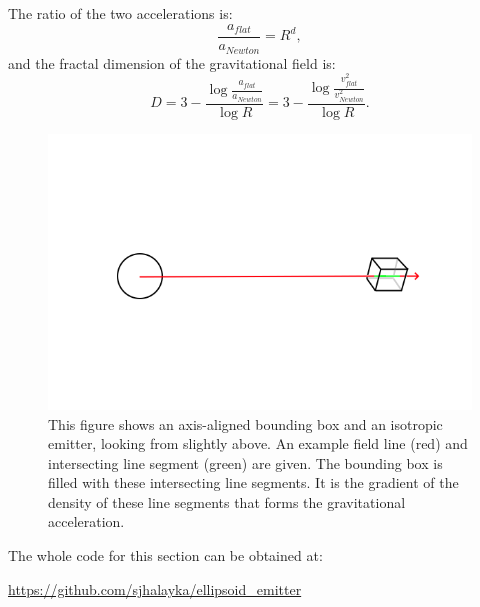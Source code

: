 \documentclass[12pt]{article}
\begin{document}
The ratio of the two accelerations is:
\begin{equation}
\frac{a_{\textit{flat}}}{a_{\textit{Newton}}} = R^{d}, 
\end{equation}
and the fractal dimension of the gravitational field is:
\begin{equation}
D = 3 - \frac{\log \frac{a_{\textit{flat}}}{a_{\textit{Newton}}}}{\log R} = 3 - \frac{\log \frac{v_{\textit{flat}}^2}{v_{\textit{Newton}}^2}}{\log R}.
\end{equation}

\begin{figure} 
\centering
\label{fig1}
  \includegraphics[width = 7 in]{AABB.png}
  \caption{
This figure shows an axis-aligned bounding box and an isotropic emitter, looking from slightly above.
An example field line (red) and intersecting line segment (green) are given.
The bounding box is filled with these intersecting line segments.
It is the gradient of the density of these line segments that forms the gravitational acceleration.
}
\end{figure}

The whole code for this section can be obtained at:

\url{https://github.com/sjhalayka/ellipsoid_emitter}
\end{document}

